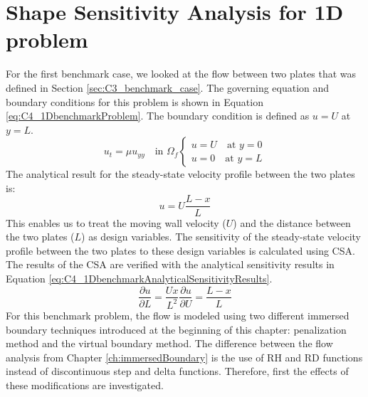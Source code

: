 \section{Shape Sensitivity Analysis for 1D problem}
For the first benchmark case, we looked at the flow between two plates that was defined in Section \ref{sec:C3_benchmark_case}. The governing equation and boundary conditions for this problem is shown in Equation \eqref{eq:C4_1DbenchmarkProblem}. The boundary condition is defined as $u = U$ at $y = L$.
%
\begin{subequations}\label{eq:C4_1DbenchmarkProblem}
\begin{equation}\label{eq:C4_1DbenchmarkGoverningEquation}
    u_t = \mu u_{yy} \quad \text{in } \Omega_f
\end{equation}
\begin{equation}\label{eq:C4_1DbenchmarkBoundaryCondition}
\begin{cases}
    u = U \quad \text{at } y = 0 \\
    u = 0 \quad \text{at } y = L
\end{cases}
\end{equation}
\end{subequations}
%
The analytical result for the steady-state velocity profile between the two plates is:
%
\begin{equation}\label{eq:C4_1DbenchmarkAnalyticalSolution}
    u = U\frac{L - x}{L}
\end{equation}
%
This enables us to treat the moving wall velocity ($U$) and the distance between the two plates ($L$) as design variables. The sensitivity of the steady-state velocity profile between the two plates to these design variables is calculated using CSA. The results of the CSA are verified with the analytical sensitivity results in Equation \eqref{eq:C4_1DbenchmarkAnalyticalSensitivityResults}.
%
\begin{subequations}\label{eq:C4_1DbenchmarkAnalyticalSensitivityResults}
\begin{equation}\label{eq:C4_1DbenchmarkAnalyticalSAlength}
    \frac{\partial u}{\partial L} = \frac{Ux}{L^2}
\end{equation}
\begin{equation}\label{eq:C4_1DbenchmarkAnalyticalSAvelocity}
    \frac{\partial u}{\partial U} = \frac{L - x}{L}
\end{equation}
\end{subequations}
%
For this benchmark problem, the flow is modeled using two different immersed boundary techniques introduced at the beginning of this chapter: penalization method and the virtual boundary method. The difference between the flow analysis from Chapter \ref{ch:immersedBoundary} is the use of RH and RD functions instead of discontinuous step and delta functions. Therefore, first the effects of these modifications are investigated.

